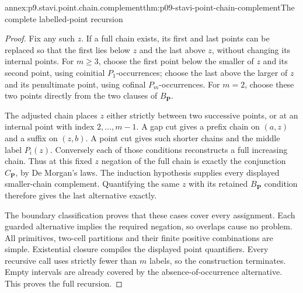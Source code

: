 \begin{annexitem}{annex:p9.stavi.point.chain.complement}{thm:p09-stavi-point-chain-complement}{The complete labelled-point recursion}
\begin{proof}
Fix any such \(z\).
If a full chain exists,
its first and last points
can be replaced so that
the first lies below \(z\)
and the last above \(z\),
without changing its internal
points. For \(m\geq3\),
choose the first point
below the smaller of \(z\)
and its second point, using
coinitial \(P_1\)-occurrences;
choose the last above the
larger of \(z\) and its
penultimate point, using
cofinal \(P_m\)-occurrences.
For \(m=2\), choose these
two points directly from
the two clauses of
\(B_{\mathbf P}\).

The adjusted chain places
\(z\) either strictly between
two successive points, or
at an internal point with
index \(2,\ldots,m-1\).
A gap cut gives a prefix
chain on \((a,z)\) and
a suffix on \((z,b)\).
A point cut gives such
shorter chains and the
middle label \(P_i(z)\).
Conversely each of those
conditions reconstructs
a full increasing chain.
Thus at this fixed \(z\)
negation of the full chain
is exactly the conjunction
\(C_{\mathbf P}\), by
De Morgan's laws.
The induction hypothesis
supplies every displayed
smaller-chain complement.
Quantifying the same \(z\)
with its retained
\(B_{\mathbf P}\) condition
therefore gives the last
alternative exactly.

The boundary classification
proves that these cases
cover every assignment.
Each guarded alternative
implies the required
negation, so overlaps
cause no problem.
All primitives, two-cell
partitions and their
finite positive combinations
are simple. Existential
closure compiles the
displayed point quantifiers.
Every recursive call uses
strictly fewer than \(m\)
labels, so the construction
terminates. Empty intervals
are already covered by
the absence-of-occurrence
alternative. This proves
the full recursion.
\end{proof}
\end{annexitem}

